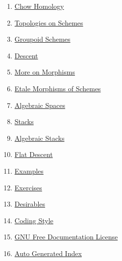 \begin{multicols}{2}
\begin{enumerate}
\item \hyperref[chow-section-phantom]{Chow Homology}
\item \hyperref[topologies-section-phantom]{Topologies on Schemes}
\item \hyperref[groupoids-section-phantom]{Groupoid Schemes}
\item \hyperref[descent-section-phantom]{Descent}
\item \hyperref[more-morphisms-section-phantom]{More on Morphisms}
\item \hyperref[etale-section-phantom]{Etale Morphisms of Schemes}
\item \hyperref[spaces-section-phantom]{Algebraic Spaces}
\item \hyperref[stacks-section-phantom]{Stacks}
\item \hyperref[algebraic-section-phantom]{Algebraic Stacks}
\item \hyperref[flat-section-phantom]{Flat Descent}
\item \hyperref[examples-section-phantom]{Examples}
\item \hyperref[exercises-section-phantom]{Exercises}
\item \hyperref[desirables-section-phantom]{Desirables}
\item \hyperref[coding-section-phantom]{Coding Style}
\item \hyperref[fdl-section-phantom]{GNU Free Documentation License}
\item \hyperref[index-section-phantom]{Auto Generated Index}
\end{enumerate}
\end{multicols}
